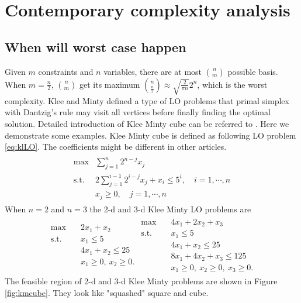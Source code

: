 \documentclass[11pt]{article}
\begin{document}
\section{Contemporary complexity analysis}
\subsection{When will worst case happen} \label{secworst}
Given $m$ constraints and $n$ variables, there are at most $\binom{n}{m}$ possible basis. When $m=\frac{n}{2}$, $\binom{n}{m}$ get its maximum $\binom{n}{\frac{n}{2}}\approx \sqrt{\frac{2}{\pi n}}2^n$,  which is the worst complexity. Klee and Minty defined a type of LO problems that primal simplex with Dantzig's rule may visit all vertices before finally finding the optimal solution. Detailed introduction of Klee Minty cube can be referred to \cite{vanderbei2020linear}. Here we demonstrate some examples. Klee Minty cube is defined as following LO problem \ref{eq:klLO}. The coefficients might be different in other articles. 
\begin{align}
\begin{split}
\max &\sum_{j=1}^n 2^{n-j}x_j \\
\text{s.t. } & 2\sum_{j=1}^{i-1}2^{i-j}x_j + x_i \le 5^i, \quad i=1,\cdots,n\\
			&x_j \ge 0,  \quad j=1,\cdots,n
\end{split}\label{eq:klLO}
\end{align} 
When $n=2$ and $n=3$ the 2-d and 3-d Klee Minty LO problems are 
\begin{align*}
\begin{split}
\max \quad & 2x_1 + x_2 \\
\text{s.t. }\quad  & x_1 \le 5\\
& 4x_1 + x_2 \le 25\\
& x_1 \ge 0,\ x_2 \ge 0.
\end{split}
\begin{split}
\max \quad & 4x_1 + 2x_2 + x_3 \\
\text{s.t. }\quad  & x_1 \le 5\\
& 4x_1 + x_2 \le 25\\
& 8x_1 + 4x_2 + x_3 \le 125\\
& x_1 \ge 0,\ x_2 \ge 0, \ x_3 \ge 0.
\end{split}
\end{align*}
The feasible region of 2-d and 3-d Klee Minty problems are shown in Figure \ref{fig:kmcube}. They look like "squashed" square and cube.
\end{document}
